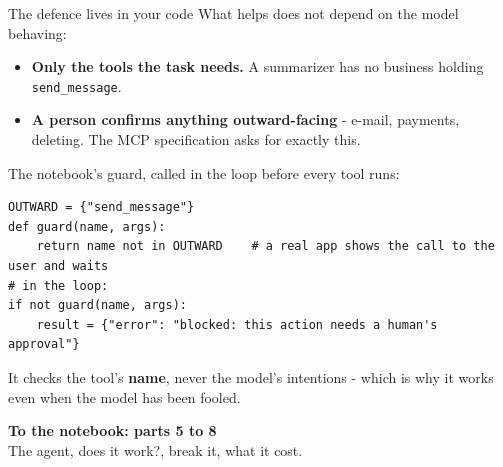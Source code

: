 \documentclass[aspectratio=169]{beamer}
\newcommand{\keybox}[1]{%
  \begin{tcolorbox}[colback=armblue!8, colframe=armblue, boxrule=0.6pt, arc=2pt]
  #1
  \end{tcolorbox}}
\newcommand{\notebookframe}[2]{%
  \begin{frame}[plain]
    \vfill
    \begin{center}
      {\Large\bfseries\color{paramgreen} To the notebook: #1}\\[1.0em]
      {\large #2}
    \end{center}
    \vfill
  \end{frame}}
\begin{document}
\begin{frame}[fragile]{The defence lives in your code}
  \vspace{0.5em}
  What helps does not depend on the model behaving:
  \begin{itemize}
    \item \textbf{Only the tools the task needs.} A summarizer has no business holding \texttt{send\_message}.
    \item \textbf{A person confirms anything outward-facing} - e-mail, payments, deleting. The MCP specification
      asks for exactly this.
  \end{itemize}

  \vspace{0.3em}
  {\small The notebook's guard, called in the loop before every tool runs:}
  \begin{lstlisting}
OUTWARD = {"send_message"}
def guard(name, args):
    return name not in OUTWARD    # a real app shows the call to the user and waits
# in the loop:
if not guard(name, args):
    result = {"error": "blocked: this action needs a human's approval"}
\end{lstlisting}

  \keybox{\small It checks the tool's \textbf{name}, never the model's intentions - which is why it works even when
  the model has been fooled.}
\end{frame}



\notebookframe{parts 5 to 8}{The agent, does it work?, break it, what it cost.}
\end{document}
